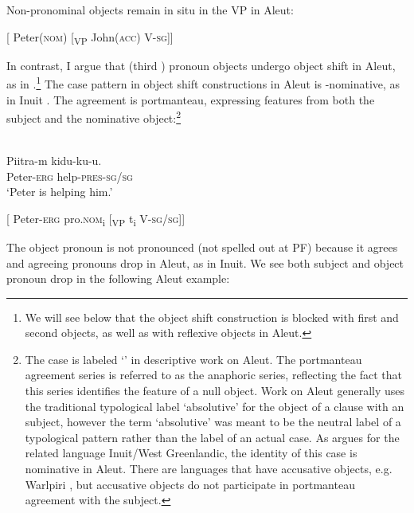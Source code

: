 \documentclass[output=paper]{LSP/langsci}
\begin{document}
Non-pronominal objects remain in situ in the VP in Aleut:

\ea\label{ex:woolford:16}
[ Peter(\textsc{nom})    [\textsubscript{VP} John(\textsc{acc})    V-\textsc{sg}]]
\z

In contrast, I argue that (third ) pronoun objects undergo object shift in Aleut, as in .\footnote{We will see below that the object shift construction is blocked with first and second  objects, as well as with reflexive objects in Aleut.} The case pattern in object shift constructions in Aleut is -nominative, as in Inuit \citep{bittner1994case,bittner1996ergativity}. The agreement is portmanteau, expressing features from both the  subject and the nominative object:\footnote{The  case is labeled ‘’ in descriptive work on Aleut. The portmanteau agreement series is referred to as the anaphoric series, reflecting the fact that this series identifies the feature of a null object. Work on Aleut generally uses the traditional typological label ‘absolutive’ for the object of a clause with an  subject, however the term ‘absolutive’ was meant to be the neutral label of a typological pattern \citep{dixon1994ergativity} rather than the label of an actual case. As \citet{bittner1994case} argues for the related language Inuit/West Greenlandic, the identity of this case is nominative in Aleut. There are  languages that have accusative objects, e.g. Warlpiri \citep{legate2006split}, but accusative objects do not participate in portmanteau agreement with the subject. }

 


\ea\label{ex:woolford:17}
\\
\gll Piitra-m   kidu-ku-u.        \\
     Peter-\textsc{erg}  help-\textsc{pres}-\textsc{sg}/\textsc{sg} \\
\glt ‘Peter is helping him.' 
\z

\ea\label{ex:woolford:18}
[ Peter-\textsc{erg}  pro.\textsc{nom}\textsubscript{i}  [\textsubscript{VP} t\textsubscript{i}  V-\textsc{sg}/\textsc{sg}]]
\z

The object pronoun is not pronounced (not spelled out at PF) because it agrees and agreeing pronouns drop in Aleut, as in Inuit. We see both subject and object pronoun drop in the following Aleut example:
\end{document}
